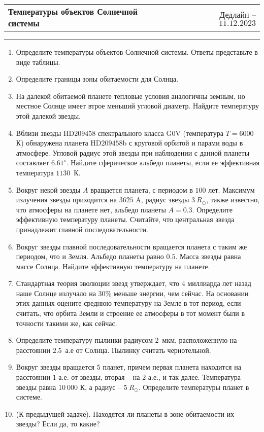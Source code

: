 \documentclass[12pt]{article}
\begin{document}
 \begin{tabularx}{\textwidth}{Xr}
  {\Large \textbf{Температуры объектов Солнечной системы}} & Дедлайн -- $11.12.2023$ \\
 \end{tabularx}
 \noindent\rule{\textwidth}{0.4pt}
 \begin{enumerate}
        \item Определите температуры объектов Солнечной системы. Ответы представьте в виде таблицы.
        \item Определите границы зоны обитаемости для Солнца.
        \item На далекой обитаемой планете тепловые условия аналогичны земным, но местное Солнце имеет втрое меньший угловой диаметр. Найдите температуру этой далекой звезды.
        \item Вблизи звезды HD$209458$ спектрального класса G$0$V (температура $T = 6000$ К) обнаружена планета HD$209458$b с круговой орбитой и парами воды в атмосфере. Угловой радиус этой звезды при наблюдении с данной планеты составляет $6.61^{\circ}$. Найдите сферическое альбедо планеты, если ее эффективная температура $1130$~К.
        \item Вокруг некой звезды $A$ вращается планета, с периодом в $100$ лет. Максимум излучения звезды приходится на $3625$ A, радиус звезды $3~R_{\odot}$, также известно, что атмосферы на планете нет, альбедо планеты $A=0.3$. Определите эффективную температуру планеты. Считайте, что центральная звезда принадлежит главной последовательности.
        \item Вокруг звезды главной последовательности вращается планета с таким же периодом, что и Земля. Альбедо планеты равно $0.5$. Масса звезды равна массе Солнца. Найдите эффективную температуру на планете.
        \item Стандартная теория эволюции звезд утверждает, что $4$ миллиарда лет назад наше Солнце излучало на $30\%$ меньше энергии, чем сейчас. На основании этих данных оцените среднюю температуру на Земле в тот период, если считать, что орбита Земли и строение ее атмосферы в тот момент были в точности такими же, как сейчас.
        \item Определите температуру пылинки радиусом $2$~мкм, расположенную на расстоянии $2.5$~а.е от Солнца. Пылинку считать чернотельной.
        \item Вокруг звезды вращается $5$ планет, причем первая планета находится на расстоянии $1$ а.е. от звезды, вторая -- на $2$ а.е., и так далее. Температура звезды равна $10~000$ К, а радиус -- $5~R_{\odot}$. Определите температуры планет в системе.
        \item (К предыдущей задаче). Находятся ли планеты в зоне обитаемости их звезды? Если да, то какие? 
 \end{enumerate}
\end{document}

